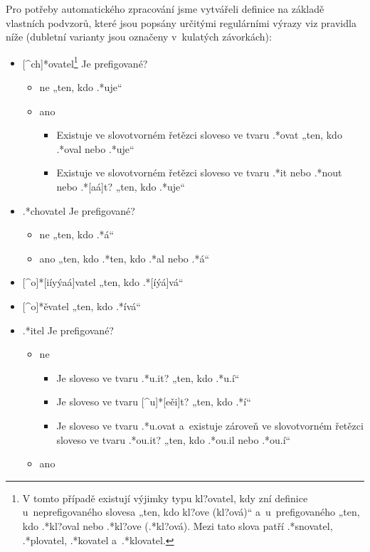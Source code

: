 Pro potřeby automatického zpracování jsme vytvářeli definice na základě
vlastních podvzorů, které jsou popsány určitými regulárními výrazy viz
pravidla níže (dubletní varianty jsou označeny v~kulatých závorkách):

\begin{itemize}
\tightlist
\item
  {[}\^{}ch{]}*ovatel\footnote{V tomto případě existují výjimky typu kl?ovatel, kdy zní definice u~neprefigovaného slovesa „ten, kdo kl?ove (kl?ová)“ a~u~prefigovaného „ten, kdo .*kl?oval nebo .*kl?ove (.*kl?ová). Mezi tato slova patří .*snovatel, .*plovatel, .*kovatel a~.*klovatel.}
  \rightarrow Je prefigované?

  \begin{itemize}
  \tightlist
  \item
    ne \rightarrow „ten, kdo .*uje``
  \item
    ano

    \begin{itemize}
    \tightlist
    \item
      Existuje ve slovotvorném řetězci sloveso ve tvaru .*ovat
      \rightarrow „ten, kdo .*oval nebo .*uje``
    \item
      Existuje ve slovotvorném řetězci sloveso ve tvaru .*it nebo .*nout
      nebo .*{[}aá{]}t? \rightarrow „ten, kdo .*uje``
    \end{itemize}
  \end{itemize}
\item
  .*chovatel \rightarrow Je prefigované?

  \begin{itemize}
  \tightlist
  \item
    ne \rightarrow „ten, kdo .*á``
  \item
    ano \rightarrow „ten, kdo .*ten, kdo .*al nebo .*á``
  \end{itemize}
\item
  {[}\^{}o{]}*{[}iíyýaá{]}vatel \rightarrow „ten, kdo
  .*{[}íýá{]}vá``
\item
  {[}\^{}o{]}*ěvatel \rightarrow „ten, kdo .*ívá``
\item
  .*itel \rightarrow Je prefigované?

  \begin{itemize}
  \tightlist
  \item
    ne

    \begin{itemize}
    \tightlist
    \item
      Je sloveso ve tvaru .*u.it? \rightarrow „ten, kdo .*u.í``
    \item
      Je sloveso ve tvaru {[}\^{}u{]}*{[}eěi{]}t? \rightarrow „ten,
      kdo .*í``
    \item
      Je sloveso ve tvaru .*u.ovat a~existuje zároveň ve slovotvorném
      řetězci sloveso ve tvaru .*ou.it? \rightarrow „ten, kdo
      .*ou.il nebo .*ou.í``
    \end{itemize}
  \item
    ano


\end{itemize}
\end{itemize}
